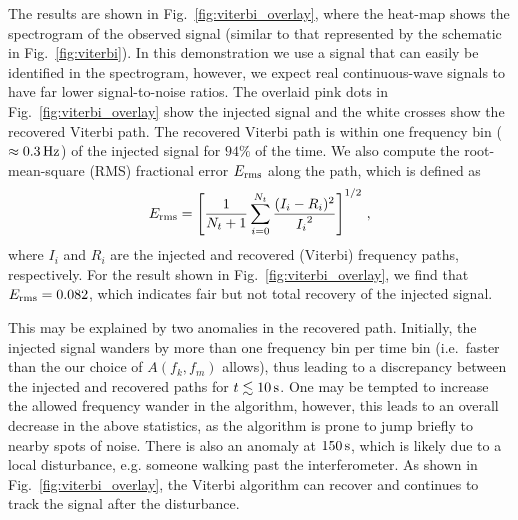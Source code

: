 \documentclass[paper-main.tex]{subfiles}
\begin{document}
The results are shown in Fig.~\ref{fig:viterbi_overlay}, where the heat-map shows the spectrogram of the observed signal (similar to that represented by the schematic in Fig.~\ref{fig:viterbi}). 
In this demonstration we use a signal that can easily be identified in the spectrogram, however, we expect real continuous-wave signals to have far lower signal-to-noise ratios. 
The overlaid pink dots in Fig.~\ref{fig:viterbi_overlay} show the injected signal and the white crosses show the recovered Viterbi path.
The recovered Viterbi path is within one frequency bin ($\approx 0.3\,{\rm Hz}$) of the injected signal for $94\%$ of the time. We also compute the root-mean-square (RMS) fractional error $E_{\rm rms}$ along the path, which is defined as 
\begin{equation}
E_{\rm rms} = \left[ \frac{1}{N_t+1} \sum_{i=0}^{N_t} \frac{(I_i - R_i)^2}{{I_i}^2} \right] ^{1/2}\,,
\end{equation}
where $I_i$ and $R_i$ are the injected and recovered (Viterbi) frequency paths, respectively. 
For the result shown in Fig.~\ref{fig:viterbi_overlay}, we find that $E_{\rm rms} = 0.082$, which indicates fair but not total recovery of the injected signal.



This may be explained by two anomalies in the recovered path. Initially, the injected signal wanders by more than one frequency bin per time bin (i.e.\ faster than the our choice of $A(f_k,f_m)$ allows), thus leading to a discrepancy between the injected and recovered paths for $t\lesssim 10\,{\rm s}$. One may be tempted to increase the allowed frequency wander in the algorithm, however, this leads to an overall decrease in the above statistics, as the algorithm is prone to jump briefly to nearby spots of noise. There is also an anomaly at $150\,{\rm s}$, which is likely due to a local disturbance, e.g. someone walking past the interferometer. 
As shown in Fig.~\ref{fig:viterbi_overlay}, the Viterbi algorithm can recover and continues to track the signal after the disturbance. 
\end{document}
